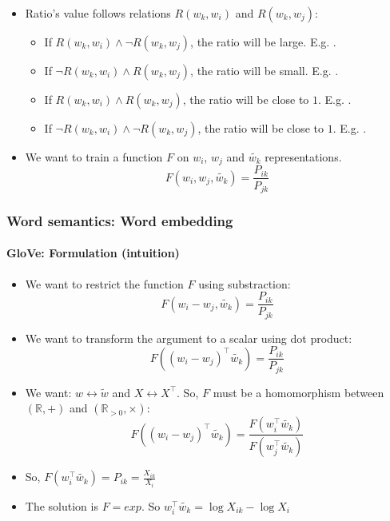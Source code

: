 \documentclass[xcolor=table]{beamer}
\begin{document}
\begin{frame}
\begin{itemize}
	\item Ratio's value follows relations $R(w_k, w_i)$ and $R(w_k, w_j)$:
	\begin{itemize}
		\item If $R(w_k, w_i) \wedge \neg R(w_k, w_j)$, the ratio will be large. E.g. .
		\item If $\neg R(w_k, w_i) \wedge R(w_k, w_j)$, the ratio will be small. E.g. .
		\item If $R(w_k, w_i) \wedge R(w_k, w_j)$, the ratio will be close to $1$. E.g. .
		\item If $\neg R(w_k, w_i) \wedge \neg R(w_k, w_j)$, the ratio will be close to $1$. E.g. .
	\end{itemize}
	\item We want to train a function $F$ on $w_i$, $w_j$ and $\tilde{w_k}$ representations.
	\[F(w_i, w_j, \tilde{w_k}) = \frac{P_{ik}}{P_{jk}}\]
\end{itemize}
	
\end{frame}

\begin{frame}
\frametitle{Word semantics: Word embedding}
\framesubtitle{GloVe: Formulation (intuition)}
	
\begin{itemize}
	\item We want to restrict the function $F$ using substraction:
	\[F(w_i - w_j, \tilde{w_k}) = \frac{P_{ik}}{P_{jk}}\]
	
	\item We want to transform the argument to a scalar using dot product:
	\[F((w_i - w_j)^\top \tilde{w_k}) = \frac{P_{ik}}{P_{jk}}\]
	
	\item We want: $w \leftrightarrow \tilde{w}$ and $X \leftrightarrow X^\top$. 
	So, $F$ must be a homomorphism between $(\mathbb{R}, +)$ and $(\mathbb{R}_{>0}, \times)$:
	\[F((w_i - w_j)^\top \tilde{w_k}) = \frac{F(w_i^\top \tilde{w_k})}{F(w_j^\top \tilde{w_k})}\]
	
	\item So, $F(w_i^\top \tilde{w_k}) = P_{ik} = \frac{X_{ik}}{X_i}$
	
	\item The solution is $F = exp$. So $w_i^\top \tilde{w_k} = \log X_{ik} - \log X_i$
\end{itemize}
	
\end{frame}
\end{document}
